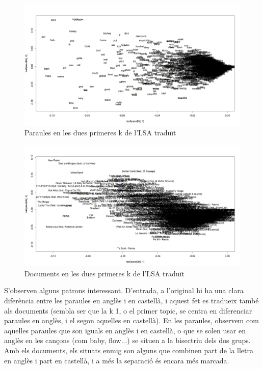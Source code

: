 \begin{figure}[H]
    \centering
    \includegraphics[width=0.8\linewidth]{Images//8_Textual//LSA/lsa_default_space_words.png}
    \caption{Paraules en les dues primeres k de l'LSA traduït}
    \label{fig:textual_lsa_trans_default_words}
\end{figure}

\begin{figure}[H]
    \centering
    \includegraphics[width=0.8\linewidth]{Images//8_Textual//LSA/lsa_default_space.png}
    \caption{Documents en les dues primeres k de l'LSA traduït}
    \label{fig:textual_lsa_trans_default}
\end{figure}

S'observen alguns patrons interessant. D'entrada, a l'original hi ha una clara diferència entre les paraules en anglès i en castellà, i aquest fet es tradueix també als documents (sembla ser que la k 1, o el primer topic, se centra en diferenciar paraules en anglès, i el segon aquelles en castellà). En les paraules, observem com aquelles paraules que son iguals en anglès i en castellà, o que se solen usar en anglès en les cançons (com baby, flow...) se situen a la bisectriu dels dos grups. Amb els documents, els situats enmig son alguns que combinen part de la lletra en anglès i part en castellà, i a més la separació és encara més marcada.

